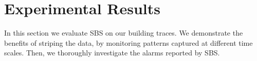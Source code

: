 
\section{Experimental Results}
In this section we evaluate SBS on our building traces.  We demonstrate
 the benefits of striping the data, by monitoring patterns captured at different time scales.
Then, we thoroughly investigate the alarms reported by SBS.



\begin{figure}[t!]
\hfill
{}\\
\hfill

\end{figure}
